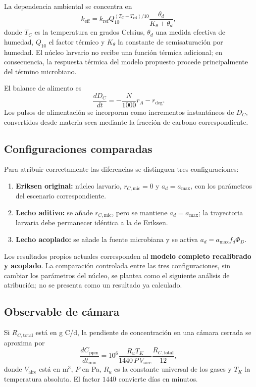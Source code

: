 La dependencia ambiental se concentra en
\[
k_{\mathrm{eff}}
=k_{\mathrm{ref}}
Q_{10}^{(T_C-T_{\mathrm{ref}})/10}
\frac{\theta_d}{K_\theta+\theta_d},
\]
donde $T_C$ es la temperatura en grados Celsius, $\theta_d$ una medida
efectiva de humedad, $Q_{10}$ el factor térmico y $K_\theta$ la
constante de semisaturación por humedad. El núcleo larvario no recibe
una función térmica adicional; en consecuencia, la respuesta térmica
del modelo propuesto procede principalmente del término microbiano.

El balance de alimento es
\[
\boxed{
\frac{dD_C}{dt}
=-\frac{N}{1000}r_A-r_{\deg}.
}
\]
Los pulsos de alimentación se incorporan como incrementos
instantáneos de $D_C$, convertidos desde materia seca mediante la
fracción de carbono correspondiente.

\subsection{Configuraciones comparadas}

Para atribuir correctamente las diferencias se distinguen tres
configuraciones:

\begin{enumerate}
\item \textbf{Eriksen original:} núcleo larvario, $r_{C,\mathrm{mic}}=0$
y $a_d=a_{\max}$, con los parámetros del escenario correspondiente.
\item \textbf{Lecho aditivo:} se añade $r_{C,\mathrm{mic}}$, pero se
mantiene $a_d=a_{\max}$; la trayectoria larvaria debe permanecer
idéntica a la de Eriksen.
\item \textbf{Lecho acoplado:} se añade la fuente microbiana y se activa
$a_d=a_{\max}f_d\Phi_D$.
\end{enumerate}

Los resultados propios actuales corresponden al \textbf{modelo completo
recalibrado y acoplado}. La comparación controlada entre las tres
configuraciones, sin cambiar los parámetros del núcleo, se plantea como
el siguiente análisis de atribución; no se presenta como un resultado
ya calculado.

\subsection{Observable de cámara}

Si $R_{C,\mathrm{total}}$ está en g C/d, la pendiente de concentración
en una cámara cerrada se aproxima por
\[
\frac{dC_{\mathrm{ppm}}}{dt_{\min}}
=
10^6\frac{R_uT_K}{1440\,P\,V_{\mathrm{aire}}}
\frac{R_{C,\mathrm{total}}}{12},
\]
donde $V_{\mathrm{aire}}$ está en m$^3$, $P$ en Pa, $R_u$ es la
constante universal de los gases y $T_K$ la temperatura absoluta. El
factor $1440$ convierte días en minutos.

